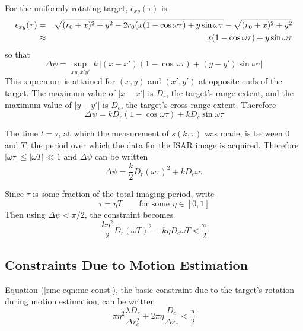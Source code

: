 For the uniformly-rotating target, $\epsilon_{xy}(\tau)$ is
\begin{eqnarray}
\epsilon_{xy}(\tau)
&=&\sqrt{(r_0+x)^2+y^2-2r_0(x(1-\cos\omega\tau)+y\sin\omega\tau}
-\sqrt{(r_0+x)^2+y^2}	{\nonumber}\\
&\approx&x(1-\cos\omega\tau)+y\sin\omega\tau
\end{eqnarray}
so that
\begin{equation}
\Delta\psi=\sup_{xy,x'y'}\,k\,\left|
(x-x')(1-\cos\omega\tau)+(y-y')\sin\omega\tau\right|
\end{equation}
This supremum is attained for $(x,y)$ and $(x',y')$ at opposite ends of the
target.  The maximum value of $\left|x-x'\right|$ is $D_r$, the target's 
range extent, and the maximum value of $\left|y-y'\right|$ is $D_c$, the 
target's cross-range extent. Therefore
\begin{equation}
\Delta\psi=k D_r(1-\cos\omega\tau)+k D_c\sin\omega\tau
\end{equation}

The time $t=\tau$, at which the measurement of $s(k,\tau)$ was made, is
between $0$ and $T$, the period over which the data for the ISAR image is
acquired.  Therefore $\left|\omega\tau\right|\leq\left|\omega T\right|\ll 1$
and $\Delta\psi$ can be written
\begin{equation}
\Delta\psi=\frac{k}{2}D_r(\omega\tau)^2+k D_c\omega\tau
\end{equation}

Since $\tau$ is some fraction of the total imaging period, write
\begin{equation}
\tau=\eta T\qquad\mbox{for some $\eta\in[0,1]$}
\end{equation}
Then using $\Delta\psi<\pi/2$, the constraint becomes
\begin{equation}\label{rmc eqn:me const}
\frac{k \eta^2}{2}D_r(\omega T)^2+k \eta D_c\omega T<\frac{\pi}{2}
\end{equation}

\subsection{Constraints Due to Motion Estimation}

Equation (\ref{rmc eqn:me const}), the basic constraint due to the
target's rotation during motion estimation, can be written 
\begin{equation}
\pi\eta^2\frac{\lambda D_r}{\Delta r_c^2}
+2\pi\eta\frac{D_c}{\Delta r_c}<\frac{\pi}{2}
\end{equation}

